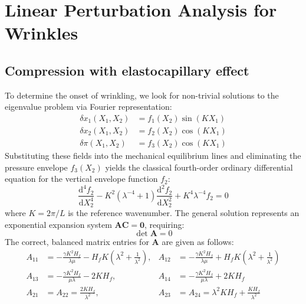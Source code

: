 \documentclass[final,3p,times]{elsarticle}
\begin{document}
\section{Linear Perturbation Analysis for Wrinkles}
\label{AppexB}
\subsection{Compression with elastocapillary effect}

To determine the onset of wrinkling, we look for non-trivial solutions to the eigenvalue problem via Fourier representation:
\begin{equation}
	\begin{aligned}
		\delta x_{1}(X_1,X_2) &= f_{1}(X_2)\sin( K X_1) \\
		\delta x_{2}(X_1,X_2) &= f_{2}(X_2)\cos(K X_1) \\
		\delta \pi(X_1,X_2) &= f_{3}(X_2)\cos(K X_1)
	\end{aligned}
	\label{eq:per_sol}
\end{equation}
Substituting these fields into the mechanical equilibrium lines and eliminating the pressure envelope $f_3(X_2)$ yields the classical fourth-order ordinary differential equation for the vertical envelope function $f_2$:
\begin{equation}
	\frac{\mathrm{d}^4 f_2}{\mathrm{d}X_2^4} - K^2\left(\lambda^{-4}+1\right)\frac{\mathrm{d}^2 f_2}{\mathrm{d}X_2^2} + K^4{\lambda}^{-4}f_2=0
		\label{eq:ODE_2}
\end{equation}
where $K=2\pi/L$ is the reference wavenumber. The general solution represents an exponential expansion system $\mathbf{A}\mathbf{C} = \mathbf{0}$, requiring:
\begin{equation}
	\det \mathbf{A}=0
	\label{eq:eig_1}
\end{equation}
The correct, balanced matrix entries for $\mathbf{A}$ are given as follows:
\begin{equation}
\begin{aligned}
	A_{11} &= -\frac{\gamma  K^2 H_f}{\lambda \mu }- H_f K\left(\lambda^2  +\frac{  1}{\lambda ^2}\right), & A_{12} &= -\frac{\gamma  K^2 H_f}{\lambda \mu }+ H_f K\left(\lambda^2  +\frac{  1}{\lambda ^2}\right) \\
	A_{13} &= -\frac{\gamma K^2 H_f}{\mu \lambda }-2 KH_f, & A_{14} &= -\frac{\gamma K^2 H_f}{\mu \lambda }+2 KH_f   \\
	A_{21} &= A_{22}=\frac{2 K H_f}{\lambda ^2}, & A_{23} &= A_{24}= \lambda ^2 K H_f+\frac{K H_f}{\lambda ^2}
\end{aligned}
\end{equation}
\end{document}
